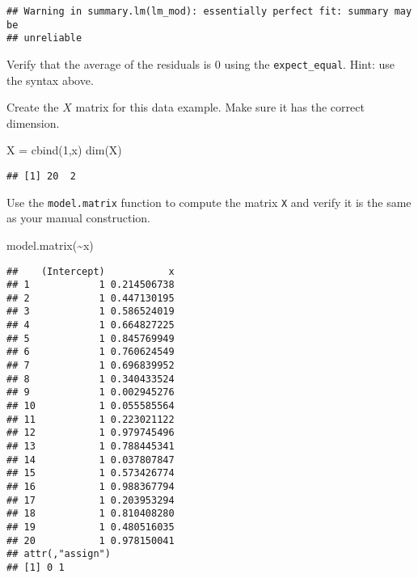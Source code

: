 \documentclass[
]{article}
\newenvironment{Shaded}{\begin{snugshade}}{\end{snugshade}}
\newcommand{\AttributeTok}[1]{\textcolor[rgb]{0.77,0.63,0.00}{#1}}
\newcommand{\DecValTok}[1]{\textcolor[rgb]{0.00,0.00,0.81}{#1}}
\newcommand{\FloatTok}[1]{\textcolor[rgb]{0.00,0.00,0.81}{#1}}
\newcommand{\FunctionTok}[1]{\textcolor[rgb]{0.00,0.00,0.00}{#1}}
\newcommand{\NormalTok}[1]{#1}
\newcommand{\OtherTok}[1]{\textcolor[rgb]{0.56,0.35,0.01}{#1}}
\newcommand{\SpecialCharTok}[1]{\textcolor[rgb]{0.00,0.00,0.00}{#1}}
\begin{document}
\begin{verbatim}
## Warning in summary.lm(lm_mod): essentially perfect fit: summary may be
## unreliable
\end{verbatim}

Verify that the average of the residuals is 0 using the
\texttt{expect\_equal}. Hint: use the syntax above.

\begin{Shaded}
\end{Shaded}

Create the \(X\) matrix for this data example. Make sure it has the
correct dimension.

\begin{Shaded}
\begin{Highlighting}[]
\NormalTok{X }\OtherTok{=} \FunctionTok{cbind}\NormalTok{(}\DecValTok{1}\NormalTok{,x)}
\FunctionTok{dim}\NormalTok{(X)}
\end{Highlighting}
\end{Shaded}

\begin{verbatim}
## [1] 20  2
\end{verbatim}

Use the \texttt{model.matrix} function to compute the matrix \texttt{X}
and verify it is the same as your manual construction.

\begin{Shaded}
\begin{Highlighting}[]
\FunctionTok{model.matrix}\NormalTok{(}\SpecialCharTok{\textasciitilde{}}\NormalTok{x)}
\end{Highlighting}
\end{Shaded}

\begin{verbatim}
##    (Intercept)           x
## 1            1 0.214506738
## 2            1 0.447130195
## 3            1 0.586524019
## 4            1 0.664827225
## 5            1 0.845769949
## 6            1 0.760624549
## 7            1 0.696839952
## 8            1 0.340433524
## 9            1 0.002945276
## 10           1 0.055585564
## 11           1 0.223021122
## 12           1 0.979745496
## 13           1 0.788445341
## 14           1 0.037807847
## 15           1 0.573426774
## 16           1 0.988367794
## 17           1 0.203953294
## 18           1 0.810408280
## 19           1 0.480516035
## 20           1 0.978150041
## attr(,"assign")
## [1] 0 1
\end{verbatim}
\end{document}
